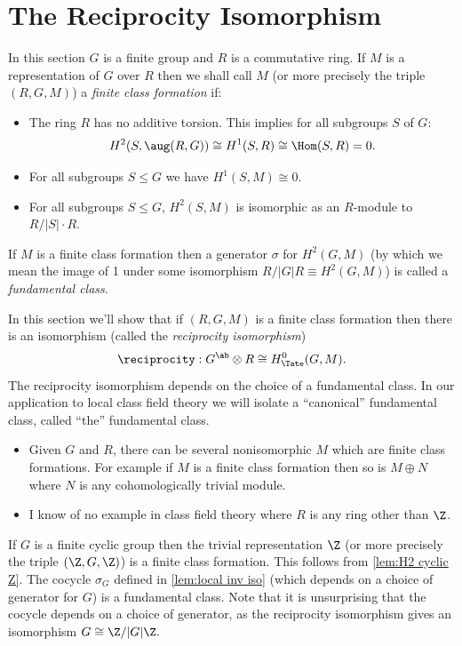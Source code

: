 \section{The Reciprocity Isomorphism}

\begin{definition}
  \label{def:fundamental class}
  \leanok
	In this section $G$ is a finite group and $R$ is a commutative ring. If $M$ is a representation
	of $G$ over $R$ then we shall call $M$ (or more precisely the triple $(R,G,M)$)
	a \emph{finite class formation} if:
	\begin{itemize}
		\item
		The ring $R$ has no additive torsion. This implies for all subgroups $S$ of $G$:
		\[
			H^2(S,\aug(R,G)) \cong H^1(S,R) \cong \Hom(S,R) = 0.
		\]
		\item
		For all subgroups $S \le G$ we have $H^1(S,M) \cong 0$.
		\item
		For all subgroups $S \le G$, $H^2(S,M)$ is isomorphic as an $R$-module to $R / |S| \cdot R$.
	\end{itemize}
	If $M$ is a finite class formation then a generator $\sigma$ for $H^2(G,M)$ (by which we
	mean the image of 1 under some isomorphism $R/|G|R\equiv H^2(G,M)$) is called
	a \emph{fundamental class}.
\end{definition}

In this section we'll show that if $(R,G,M)$ is a finite class formation
then there is an isomorphism (called the \emph{reciprocity isomorphism})
\[
	\reciprocity: G^{\ab} \otimes R \cong H^0_{\Tate}(G,M).
\]
The reciprocity isomorphism depends on the choice of a fundamental class. In our application
to local class field theory we will isolate a ``canonical'' fundamental class, called ``the''
fundamental class.

\begin{remark}
	\begin{itemize}
		\item Given $G$ and $R$, there can be several nonisomorphic $M$ which are
  		finite class formations. For example if $M$ is a finite class formation then so is
	  	$M\oplus N$ where $N$ is any cohomologically trivial module.
	  \item I know of no example in class field theory where $R$ is any ring other than $\Z$.
	\end{itemize}
\end{remark}

\begin{example}
	If $G$ is a finite cyclic group then the trivial representation $\Z$
	(or more precisely the triple $(\Z,G,\Z)$) is a finite class formation.
	This follows from \ref{lem:H2 cyclic Z}.
	The cocycle $\sigma_G$ defined in \ref{lem:local inv iso} (which depends on
	a choice of generator for $G$) is a fundamental class. Note that it is unsurprising
	that the cocycle depends on a choice of generator, as the
	reciprocity isomorphism gives an isomorphism $G\cong \Z/|G|\Z.$
\end{example}

